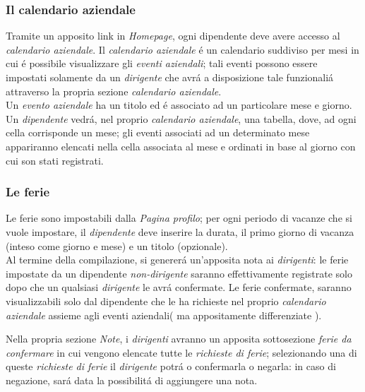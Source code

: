 \documentclass[paper=a4, fontsize=11pt]{scrartcl} %
\numberwithin{equation}{section} %
\numberwithin{figure}{section} %
\numberwithin{table}{section} %
\begin{document}
\subsubsection{Il calendario aziendale}

Tramite un apposito link in \textit{Homepage}, ogni dipendente deve avere accesso al \textit{calendario aziendale}.
Il \textit{calendario aziendale} \'e un calendario suddiviso per mesi in cui \'e possibile visualizzare gli \textit{eventi aziendali};
tali eventi possono essere impostati solamente da un \textit{dirigente} che avr\'a a disposizione tale funzionali\'a attraverso
la propria sezione \textit{calendario aziendale}.\\
Un \textit{evento aziendale}  ha un titolo ed \'e associato ad un particolare mese e giorno.\\

Un \textit{dipendente} vedr\'a, nel proprio \textit{calendario aziendale}, una tabella, dove, ad ogni cella
corrisponde un mese; gli eventi associati ad un determinato mese appariranno elencati nella cella associata al mese
e ordinati in base al giorno con cui son stati registrati.



\subsubsection{Le ferie}
Le ferie sono impostabili dalla \textit{Pagina profilo}; per ogni periodo di vacanze che si vuole impostare,
il \textit{dipendente} deve inserire la durata, il primo giorno di vacanza (inteso come giorno e mese) e un titolo (opzionale).\\
Al termine della compilazione, si generer\'a un'apposita nota ai \textit{dirigenti}: le ferie impostate da un dipendente
\textit{non-dirigente} saranno effettivamente registrate solo dopo che un qualsiasi \textit{dirigente} le avr\'a confermate.
Le ferie confermate, saranno visualizzabili solo dal dipendente che le ha richieste nel proprio \textit{calendario aziendale}
 assieme agli eventi aziendali( ma appositamente differenziate ).

Nella propria sezione \textit{Note}, i \textit{dirigenti} avranno un apposita sottosezione \textit{ferie da confermare}
in cui vengono elencate tutte le \textit{richieste di ferie}; selezionando una di queste \textit{richieste di ferie}
il \textit{dirigente} potr\'a o confermarla o negarla: in caso di negazione, sar\'a data la possibilit\'a di aggiungere
una nota.
\end{document}
